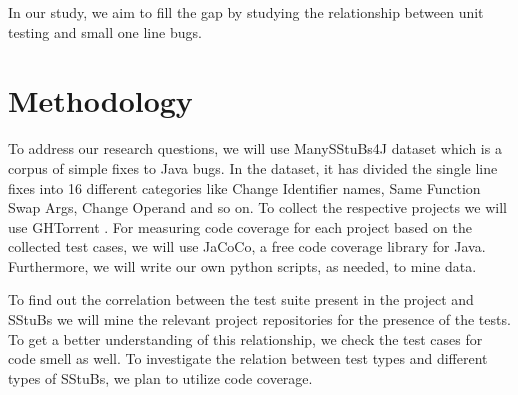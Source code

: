 \documentclass[11pt]{article}
\begin{document}
In our study, we aim to fill the gap by studying the relationship between unit testing and small one line bugs.



\section{Methodology}

To address our research questions, we will use ManySStuBs4J\cite{karampatsis2020often} dataset which is a corpus of simple fixes to Java bugs. In the dataset, it has divided the single line fixes into 16 different categories like Change Identifier names, Same Function Swap Args, Change Operand and so on. To collect the respective projects we will use GHTorrent \cite{Gousi13}. For measuring code coverage for each project based on the collected test cases, we will use JaCoCo, a free code coverage library for Java. Furthermore, we will write our own python scripts, as needed, to mine data.

To find out the correlation between the test suite present in the project and SStuBs we will mine the relevant project repositories for the presence of the tests. To get a better understanding of this relationship, we check the test cases for code smell as well. To investigate the relation between test types and different types of SStuBs, we plan to utilize code coverage.




\end{document}
